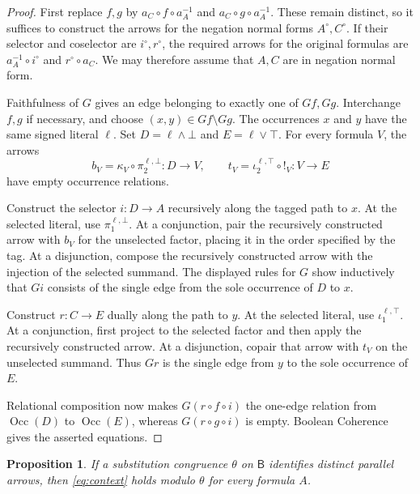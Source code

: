 \documentclass[11pt]{article}
\newtheorem{proposition}[theorem]{Proposition}
\newcommand{\B}{\mathsf B}
\newcommand{\Occ}{\operatorname{Occ}}
\begin{document}
\begin{proof}
First replace $f,g$ by $a_C\circ f\circ a_A^{-1}$ and
$a_C\circ g\circ a_A^{-1}$. These remain distinct, so it suffices to
construct the arrows for the negation normal forms $A^\circ,C^\circ$.
If their selector and coselector are $i^\circ,r^\circ$, the required
arrows for the original formulas are
$a_A^{-1}\circ i^\circ$ and $r^\circ\circ a_C$.
We may therefore assume that $A,C$ are in negation normal form.

Faithfulness of $G$ gives an edge belonging to exactly one of $Gf,Gg$.
Interchange $f,g$ if necessary, and choose
$(x,y)\in Gf\setminus Gg$. The occurrences $x$ and $y$ have the same
signed literal $\ell$. Set $D=\ell\wedge\bot$ and $E=\ell\vee\top$.
For every formula $V$, the arrows
\[
 b_V=\kappa_V\circ\pi_2^{\ell,\bot}:D\to V,
 \qquad
 t_V=\iota_2^{\ell,\top}\circ!_V:V\to E
\]
have empty occurrence relations.

Construct the selector $i:D\to A$ recursively along the tagged path
to $x$. At the selected literal, use $\pi_1^{\ell,\bot}$.
At a conjunction, pair the recursively constructed arrow with $b_V$
for the unselected factor, placing it in the order specified by the
tag. At a disjunction, compose the recursively constructed arrow
with the injection of the selected summand. The displayed rules for
$G$ show inductively that $Gi$ consists of the single edge from the
sole occurrence of $D$ to $x$.

Construct $r:C\to E$ dually along the path to $y$.
At the selected literal, use $\iota_1^{\ell,\top}$.
At a conjunction, first project to the selected factor and then apply
the recursively constructed arrow. At a disjunction, copair that
arrow with $t_V$ on the unselected summand. Thus $Gr$ is the single
edge from $y$ to the sole occurrence of $E$.

Relational composition now makes $G(r\circ f\circ i)$ the one-edge
relation from $\Occ(D)$ to $\Occ(E)$, whereas
$G(r\circ g\circ i)$ is empty. Boolean Coherence gives the asserted
equations.
\end{proof}

\begin{proposition}\label{prop:all-contexts}
If a substitution congruence $\theta$ on $\B$ identifies distinct
parallel arrows, then \eqref{eq:context} holds modulo $\theta$ for
every formula $A$.
\end{proposition}
\end{document}
